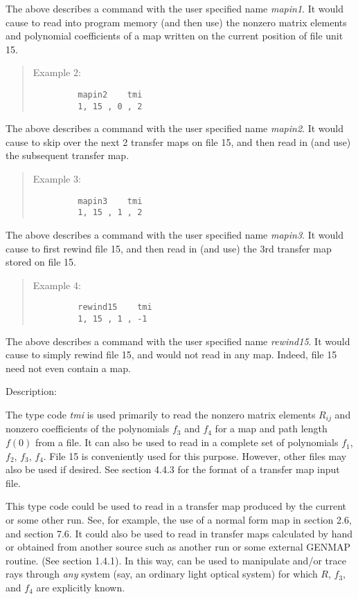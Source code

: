 The above describes a command with the user specified name {\em mapin1}.  It
would cause \Mary to read into program memory (and then use) the nonzero
matrix elements and polynomial coefficients of a map written on the current
position of file unit 15.
\begin{quotation}
\noindent     Example 2:
\begin{verbatim}
         mapin2    tmi
         1, 15 , 0 , 2
\end{verbatim}
\end{quotation}
The above describes a command with the user specified name {\em mapin2}.  It
would cause \Mary to skip over the next 2 transfer maps on file 15, and
then read in (and use) the subsequent transfer map.
\begin{quotation}
\noindent     Example 3:
\begin{verbatim}
         mapin3    tmi
         1, 15 , 1 , 2
\end{verbatim}
\end{quotation}
The above describes a command with the user specified name {\em mapin3}.  It
would cause \Mary to first rewind file 15, and then read in (and use) the
3rd transfer map stored on file 15.
\begin{quotation}
\noindent     Example 4:
\begin{verbatim}
         rewind15    tmi
         1, 15 , 1 , -1
\end{verbatim}
\end{quotation}
The above describes a command with the user specified name {\em rewind15}.  It
would cause \Mary to simply rewind file 15, and would not read in any
map.  Indeed, file 15 need not even contain a map.

\vspace{5mm}
     Description:
\vspace{2mm}

         The type code {\em tmi } is used primarily to read the nonzero matrix
elements $R_{ij}$ and nonzero coefficients of the polynomials $f_3$  and $f_4$ for a map
and path length $f(0)$ from a file.  It can also be used to read in a complete set of
polynomials $f_1$, $f_2$, $f_3$, $f_4$.  File 15 is conveniently used for this purpose.  However,
other files may also be used if desired.  See section 4.4.3 for the format of a
transfer map input file.

         This type code could be used to read in a transfer map produced by
the current or some other \Mary run.  See, for example, the use of a normal form map in
section 2.6, and section 7.6.  It could also be used to read in transfer maps calculated by
hand or obtained from another source such as another \Mary run or some
external GENMAP routine.  (See section 1.4.1).
In this way, \Mary can be used to manipulate and/or trace rays through
{\em any } system (say, an ordinary light
optical system) for which $R$, $f_3$, and $f_4$ are explicitly known.

